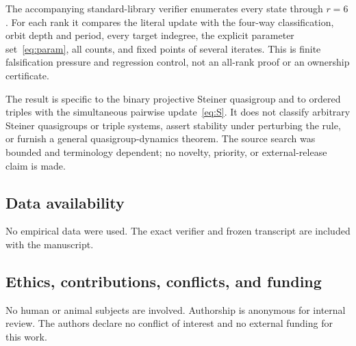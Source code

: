 \documentclass[a4paper,10pt]{amsart}
\theoremstyle{remark}
\begin{document}
The accompanying standard-library verifier enumerates every state through
$r=6$.  For each rank it compares the literal update with the four-way
classification, orbit depth and period, every target indegree, the explicit
parameter set~\eqref{eq:param}, all counts, and fixed points of several
iterates.  This is finite falsification pressure and regression control, not
an all-rank proof or an ownership certificate.

The result is specific to the binary projective Steiner quasigroup and to
ordered triples with the simultaneous pairwise update~\eqref{eq:S}.  It does
not classify arbitrary Steiner quasigroups or triple systems, assert stability
under perturbing the rule, or furnish a general quasigroup-dynamics theorem.
The source search was bounded and terminology dependent; no novelty, priority,
or external-release claim is made.

\subsection*{Data availability}
No empirical data were used.  The exact verifier and frozen transcript are
included with the manuscript.

\subsection*{Ethics, contributions, conflicts, and funding}
No human or animal subjects are involved.  Authorship is anonymous for
internal review.  The authors declare no conflict of interest and no external
funding for this work.



\end{document}
